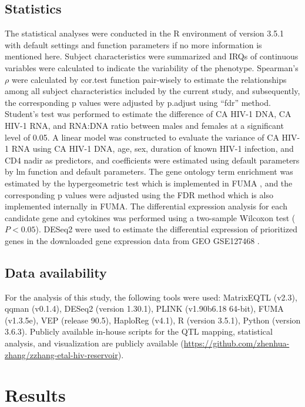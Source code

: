 \documentclass{book}
\begin{document}
\begin{refsection}
\subsection*{Statistics}
The statistical analyses were conducted in the R environment of version 3.5.1 with default settings and function parameters if no more information is mentioned here.
Subject characteristics were summarized and IRQs of continuous variables were calculated to indicate the variability of the phenotype.
Spearman's $\rho$ were calculated by cor.test function pair-wisely to estimate the relationships among all subject characteristics included by the current study, and subsequently, the corresponding p values were adjusted by p.adjust using “fdr” method.
Student's test was performed to estimate the difference of CA HIV-1 DNA, CA HIV-1 RNA, and RNA:DNA ratio between males and females at a significant level of 0.05.
A linear model was constructed to evaluate the variance of CA HIV-1 RNA using CA HIV-1 DNA, age, sex, duration of known HIV-1 infection, and CD4 nadir as predictors, and coefficients were estimated using default parameters by lm function and default parameters.
The gene ontology term enrichment was estimated by the hypergeometric test which is implemented in FUMA \cite{Fuhrer2011High}, and the corresponding p values were adjusted using the FDR method which is also implemented internally in FUMA.
The differential expression analysis for each candidate gene and cytokines was performed using a two-sample Wilcoxon test ($P < 0.05$).
DESeq2 \cite{Love2014Moderated} were used to estimate the differential expression of prioritized genes in the downloaded gene expression data from GEO GSE127468 \cite{Shytaj2020Alterations}.

\subsection*{Data availability}
For the analysis of this study, the following tools were used: MatrixEQTL (v2.3), qqman (v0.1.4), DESeq2 (version 1.30.1), PLINK (v1.90b6.18 64-bit), FUMA (v1.3.5e), VEP (release 90.5), HaploReg (v4.1), R (version 3.5.1), Python (version 3.6.3).
Publicly available in-house scripts for the QTL mapping, statistical analysis, and visualization are publicly available (\url{https://github.com/zhenhua-zhang/zzhang-etal-hiv-reservoir}).

\section*{Results}

\end{refsection}
\end{document}

